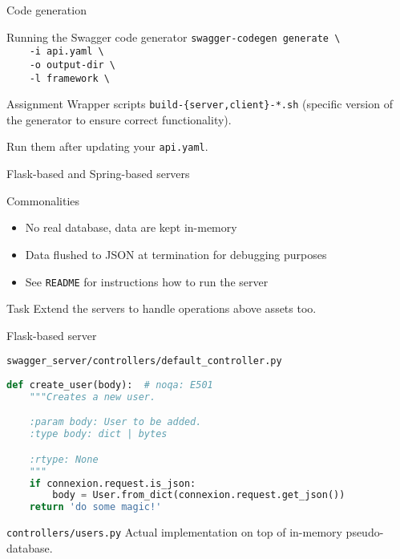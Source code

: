 \begin{frame}{Code generation}
    \begin{block}{Running the Swagger code generator}
        \texttt{swagger-codegen generate \textbackslash} \\
        \texttt{~~~ -i api.yaml \textbackslash} \\
        \texttt{~~~ -o output-dir \textbackslash} \\
        \texttt{~~~ -l framework \textbackslash}
    \end{block}
    
    \begin{block}{Assignment}
        Wrapper scripts \texttt{build-\{server,client\}-*.sh}
        (specific version of the generator to ensure correct
        functionality).
        
        \medskip
        
        Run them after updating your \texttt{api.yaml}.
    \end{block}
\end{frame}


\begin{frame}{Flask-based and Spring-based servers}
    \begin{block}{Commonalities}
        \begin{itemize}
            \item No real database, data are kept in-memory
            \item Data flushed to JSON at termination for debugging
                purposes
            \item See \texttt{README} for instructions how to run
                the server
        \end{itemize}
    \end{block}
    
    \begin{block}{Task}
        Extend the servers to handle operations above
        assets too.
    \end{block}
\end{frame}


\begin{frame}[fragile]{Flask-based server}
    \begin{block}{\texttt{swagger\_server/controllers/default\_controller.py}}
\begin{lstlisting}[language=Python,style=mini]
def create_user(body):  # noqa: E501
    """Creates a new user.

    :param body: User to be added.
    :type body: dict | bytes

    :rtype: None
    """
    if connexion.request.is_json:
        body = User.from_dict(connexion.request.get_json())
    return 'do some magic!'
\end{lstlisting}
    \end{block}

    \begin{block}{\texttt{controllers/users.py}}
        Actual implementation on top of in-memory pseudo-database.
    \end{block}
\end{frame}


